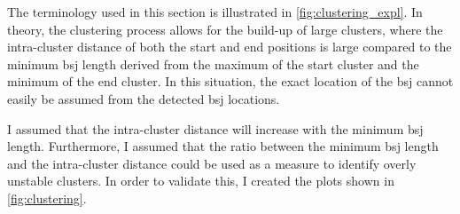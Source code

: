 The terminology used in this section is illustrated in
\cref{fig:clustering_expl}.
In theory, the clustering process allows for the build-up of large clusters,
where the intra-cluster distance of both the start and end positions is large
compared to the minimum \gls{bsj} length derived from the maximum of the start
cluster and the minimum of the end cluster.
In this situation, the exact location of the \gls{bsj} cannot easily be assumed
from the detected \gls{bsj} locations.

I assumed that the intra-cluster distance will increase with the minimum
\gls{bsj} length.
Furthermore, I assumed that the ratio between the minimum \gls{bsj} length and
the intra-cluster distance could be used as a measure to identify overly
unstable clusters.
In order to validate this, I created the plots shown in \cref{fig:clustering}.

